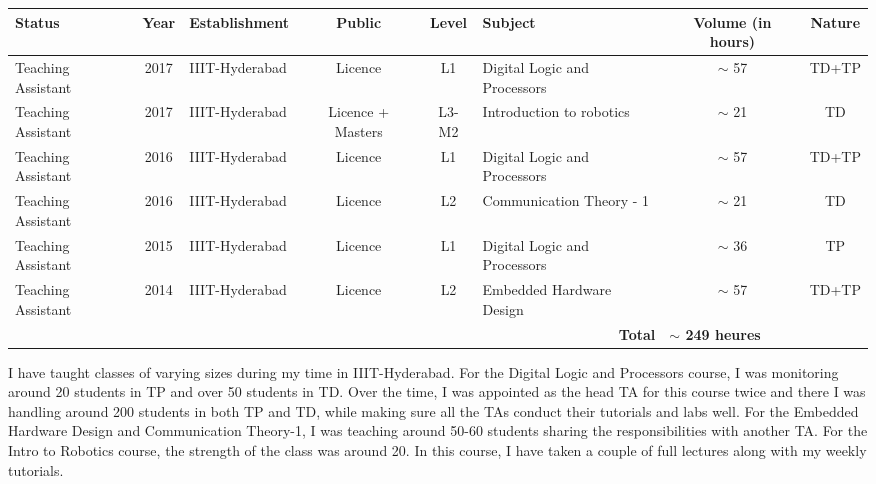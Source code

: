 \documentclass[11pt]{article}
\renewcommand{\arraystretch}{1.35}
\begin{document}
\begin{table}[H]
\centering
\fontsize{10}{12}\selectfont
\setlength{\tabcolsep}{3pt} %
\renewcommand{\arraystretch}{0.95} %
\begin{tabularx}{\linewidth}{|l|c|l|c|c|X|c|c|}
\hline
\textbf{Status} & \textbf{Year} & \textbf{Establishment} & \textbf{Public} & \textbf{Level} & \textbf{Subject} & \textbf{Volume (in hours)} & \textbf{Nature} \\ \hline
Teaching Assistant & 2017 & IIIT-Hyderabad & Licence & L1 & Digital Logic and Processors & $\sim$ 57 & TD+TP \\ \hline
Teaching Assistant & 2017 & IIIT-Hyderabad & Licence + Masters & L3-M2 & Introduction to robotics & $\sim$ 21 & TD \\ \hline
Teaching Assistant & 2016 & IIIT-Hyderabad & Licence & L1 & Digital Logic and Processors & $\sim$ 57 & TD+TP \\ \hline
Teaching Assistant & 2016 & IIIT-Hyderabad & Licence & L2 & Communication Theory - 1 & $\sim$ 21 & TD \\ \hline
Teaching Assistant & 2015 & IIIT-Hyderabad & Licence & L1 & Digital Logic and Processors & $\sim$ 36 & TP \\ \hline
Teaching Assistant & 2014 & IIIT-Hyderabad & Licence & L2 & Embedded Hardware Design & $\sim$ 57 & TD+TP \\ \hline
\multicolumn{6}{|r|}{\textbf{Total}} & \multicolumn{2}{l|}{\textbf{$\sim$ 249 heures}} \\ \hline
\end{tabularx}
\end{table}

I have taught classes of varying sizes during my time in IIIT-Hyderabad. For the Digital Logic and Processors course, I was monitoring around 20 students in TP and over 50 students in TD. Over the time, I was appointed as the head TA for this course twice and there I was handling around 200 students in both TP and TD, while making sure all the TAs conduct their tutorials and labs well. For the Embedded Hardware Design and Communication Theory-1, I was teaching around 50-60 students sharing the responsibilities with another TA. For the Intro to Robotics course, the strength of the class was around 20. In this course, I have taken a couple of full lectures along with my weekly tutorials.
\end{document}
